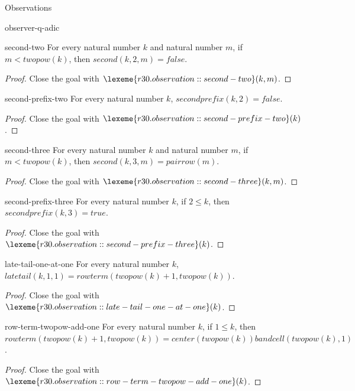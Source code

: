 \begin{lexlean}{Observations}
\begin{section}{observer-q-adic}
\begin{theorem}{second-two}
For every natural number \(k\) and natural number \(m\), if \(m < twopow(k)\), then \(second(k, 2, m) = false\).
\begin{proof}
Close the goal with \(\lexeme{r30.observation::second-two}(k, m)\).
\end{proof}
\end{theorem}

\begin{theorem}{second-prefix-two}
For every natural number \(k\), \(secondprefix(k, 2) = false\).
\begin{proof}
Close the goal with \(\lexeme{r30.observation::second-prefix-two}(k)\).
\end{proof}
\end{theorem}

\begin{theorem}{second-three}
For every natural number \(k\) and natural number \(m\), if \(m < twopow(k)\), then \(second(k, 3, m) = pairrow(m)\).
\begin{proof}
Close the goal with \(\lexeme{r30.observation::second-three}(k, m)\).
\end{proof}
\end{theorem}

\begin{theorem}{second-prefix-three}
For every natural number \(k\), if \(2 ≤ k\), then \(secondprefix(k, 3) = true\).
\begin{proof}
Close the goal with \(\lexeme{r30.observation::second-prefix-three}(k)\).
\end{proof}
\end{theorem}

\begin{theorem}{late-tail-one-at-one}
For every natural number \(k\), \(latetail(k, 1, 1) = rowterm(twopow(k) + 1, twopow(k))\).
\begin{proof}
Close the goal with \(\lexeme{r30.observation::late-tail-one-at-one}(k)\).
\end{proof}
\end{theorem}

\begin{theorem}{row-term-twopow-add-one}
For every natural number \(k\), if \(1 ≤ k\), then \(rowterm(twopow(k) + 1, twopow(k)) = center(twopow(k)) band cell(twopow(k), 1)\).
\begin{proof}
Close the goal with \(\lexeme{r30.observation::row-term-twopow-add-one}(k)\).
\end{proof}
\end{theorem}


\end{section}
\end{lexlean}
